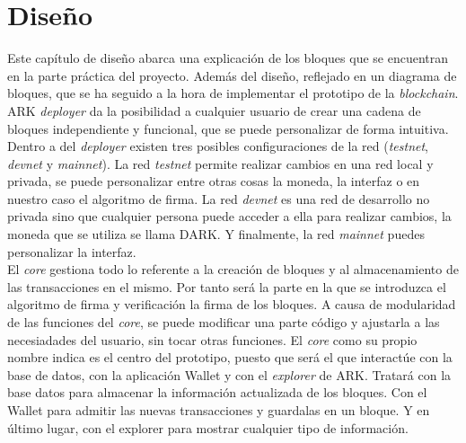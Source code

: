 \chapter{Diseño}
\label{sec:diseno}



Este capítulo de diseño abarca una explicación de los bloques que se encuentran en la parte práctica del proyecto. Además del diseño, reflejado en un diagrama de bloques, que se ha seguido a la hora de implementar el prototipo de la \textit{blockchain}.\\

ARK \textit{deployer} \cite{deployer} da la posibilidad a cualquier usuario de crear una cadena de bloques independiente y funcional, que se puede personalizar de forma intuitiva. Dentro a del \textit{deployer} existen tres posibles configuraciones de la red (\textit{testnet}, \textit{devnet} y \textit{mainnet}). La red \textit{testnet} permite realizar cambios en una red local y privada, se puede personalizar entre otras cosas la moneda, la interfaz o en nuestro caso el algoritmo de firma. La red \textit{devnet} es una red de desarrollo no privada sino que cualquier persona puede acceder a ella para realizar cambios, la moneda que se utiliza se llama DARK. Y finalmente, la red \textit{mainnet} puedes personalizar la interfaz. \\

El \textit{core} gestiona todo lo referente a la creación de bloques y al almacenamiento de las transacciones en el mismo. Por tanto será la parte en la que se introduzca el algoritmo de firma y verificación la firma de los bloques. A causa de modularidad de las funciones del \textit{core}, se puede modificar una parte código y ajustarla a las necesiadades del usuario, sin tocar otras funciones. El \textit{core} como su propio nombre indica es el centro del prototipo, puesto que será el que interactúe con la base de datos, con la aplicación Wallet y con el \textit{explorer} de ARK. Tratará con la base datos para almacenar la información actualizada de los bloques. Con el Wallet para admitir las nuevas transacciones y guardalas en un bloque. Y en último lugar, con el explorer para mostrar cualquier tipo de información.\\


